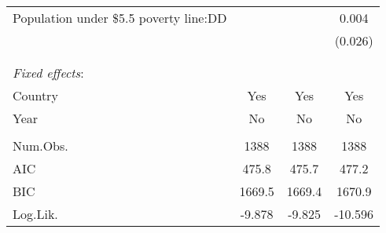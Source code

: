 \documentclass[a4paper, 12pt]{article}
\begin{document}
\begin{table}
\begin{tabular}[t]{lccc}
Population under \$5.5 poverty line:DD &  &  & 0.004\\
 &  &  & (0.026)\\
 & & & \\ 
  \hline \\[-1.8ex] 
 \textit{Fixed effects}:\\
Country & Yes & Yes & Yes\\
Year & No & No & No \\
\hline \\[-1.8ex] 
Num.Obs. & 1388 & 1388 & 1388\\
AIC & 475.8 & 475.7 & 477.2\\
BIC & 1669.5 & 1669.4 & 1670.9\\
Log.Lik. & -9.878 & -9.825 & -10.596\\
\hline 
\hline 
\end{tabular}
\end{table}
	
\end{document}
